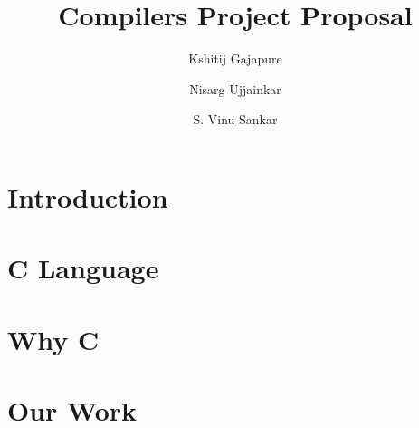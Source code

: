 \documentclass{clv3}
\author{Kshitij Gajapure}
\affil{16110055}
\author{Nisarg Ujjainkar}
\affil{16110102}
\author{S. Vinu Sankar}
\affil{16110143}
\title{Compilers Project Proposal}
\begin{document}
    \maketitle  
    \section{Introduction}
    
    \section{C Language}
    
    \section{Why C}
    
    \section{Our Work}
    
\end{document}
